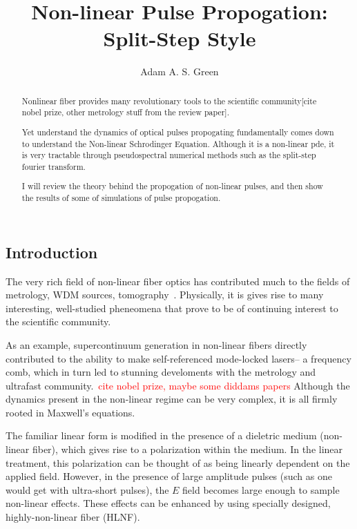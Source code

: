 \documentclass[12pt, titlepage]{article}
\title{Non-linear Pulse Propogation: Split-Step Style}
\author{Adam A. S. Green}
\begin{document}
\begin{spacing}{1.1}

\maketitle
\begin{abstract}
Nonlinear fiber provides many revolutionary tools to the scientific community[cite nobel prize, other metrology stuff from the review paper]\cite{dudrev}.

Yet understand the dynamics of optical pulses propogating fundamentally comes down to understand the Non-linear Schrodinger Equation. Although it is a non-linear pde, it is very tractable through pseudospectral numerical methods such as the split-step fourier transform\cite{gorovind}.

I will review the theory behind the propogation of non-linear pulses, and then show the results of some of simulations of pulse propogation. 

\end{abstract}

\section{Introduction}
\label{sec:intro}

The very rich field of non-linear fiber optics has contributed much to the fields of metrology, WDM sources, tomography~\cite{gor}.
Physically, it is gives rise to many interesting, well-studied pheneomena that prove to be of continuing interest to the scientific community.\cite{dudrev,zhu}

As an example, supercontinuum generation in non-linear fibers directly contributed to the ability to make self-referenced mode-locked lasers-- a frequency comb, which in turn led to stunning develoments with the metrology and ultrafast community.~\textcolor{red}{cite nobel prize, maybe some diddams papers}
Although the dynamics present in the non-linear regime can be very complex, it is all firmly rooted in Maxwell's equations.


The familiar linear form is modified in the presence of a dieletric medium (non-linear fiber), which gives rise to a polarization within the medium.
In the linear treatment, this polarization can be thought of as being linearly dependent on the applied field.
However, in the presence of large amplitude pulses (such as one would get with ultra-short pulses), the $E$ field becomes large enough to
sample non-linear effects. 
These effects can be enhanced by using specially designed, highly-non-linear fiber (HLNF).


\end{spacing}
\end{document}
